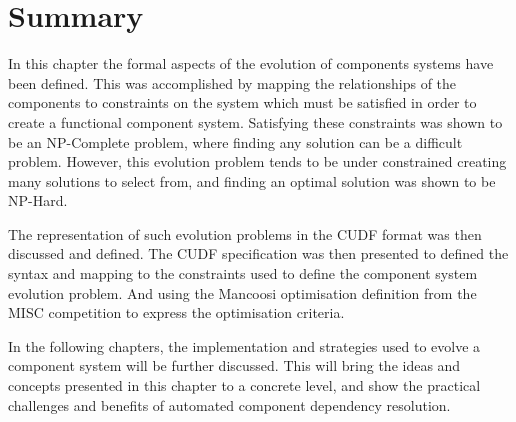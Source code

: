 \section{Summary}
In this chapter the formal aspects of the evolution of components systems have been defined.
This was accomplished by mapping the relationships of the components to constraints on the system which must be satisfied in order to create a functional component system.
Satisfying these constraints was shown to be an NP-Complete problem, where finding any solution can be a difficult problem.
However, this evolution problem tends to be under constrained creating many solutions to select from, and finding an optimal solution was shown to be NP-Hard.

The representation of such evolution problems in the CUDF format was then discussed and defined.
The CUDF specification was then presented to defined the syntax and mapping to the constraints used to define the component system evolution problem.
And using the Mancoosi optimisation definition from the MISC competition to express the optimisation criteria.

In the following chapters, the implementation and strategies used to evolve a component system will be further discussed.
This will bring the ideas and concepts presented in this chapter to a concrete level, and show the practical challenges and benefits of automated component dependency resolution. 